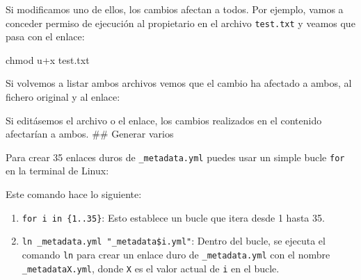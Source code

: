 \documentclass[
  jou,
  floatsintext,
  longtable,
  a4paper,
  nolmodern,
  notxfonts,
  notimes,
  colorlinks=true,linkcolor=blue,citecolor=blue,urlcolor=blue]{apa7}
\newenvironment{Shaded}{\begin{snugshade}}{\end{snugshade}}
\newcommand{\AttributeTok}[1]{\textcolor[rgb]{0.40,0.45,0.13}{#1}}
\newcommand{\ControlFlowTok}[1]{\textcolor[rgb]{0.00,0.23,0.31}{\textbf{#1}}}
\newcommand{\DataTypeTok}[1]{\textcolor[rgb]{0.68,0.00,0.00}{#1}}
\newcommand{\DecValTok}[1]{\textcolor[rgb]{0.68,0.00,0.00}{#1}}
\newcommand{\ExtensionTok}[1]{\textcolor[rgb]{0.00,0.23,0.31}{#1}}
\newcommand{\FunctionTok}[1]{\textcolor[rgb]{0.28,0.35,0.67}{#1}}
\newcommand{\KeywordTok}[1]{\textcolor[rgb]{0.00,0.23,0.31}{\textbf{#1}}}
\newcommand{\NormalTok}[1]{\textcolor[rgb]{0.00,0.23,0.31}{#1}}
\newcommand{\StringTok}[1]{\textcolor[rgb]{0.13,0.47,0.30}{#1}}
\newcommand{\VariableTok}[1]{\textcolor[rgb]{0.07,0.07,0.07}{#1}}
\providecommand{\tightlist}{%
  \setlength{\itemsep}{0pt}\setlength{\parskip}{0pt}}
\begin{document}
Si modificamos uno de ellos, los cambios afectan a todos. Por ejemplo,
vamos a conceder permiso de ejecución al propietario en el archivo
\texttt{test.txt} y veamos que pasa con el enlace:

\begin{Shaded}
\begin{Highlighting}[]
\FunctionTok{chmod}\NormalTok{ u+x test.txt}
\end{Highlighting}
\end{Shaded}

Si volvemos a listar ambos archivos vemos que el cambio ha afectado a
ambos, al fichero original y al enlace:

\begin{Shaded}
\end{Shaded}

Si editásemos el archivo o el enlace, los cambios realizados en el
contenido afectarían a ambos. \#\# Generar varios

Para crear 35 enlaces duros de \texttt{\_metadata.yml} puedes usar un
simple bucle \texttt{for} en la terminal de Linux:

\begin{Shaded}
\end{Shaded}

Este comando hace lo siguiente:

\begin{enumerate}
\def\labelenumi{\arabic{enumi}.}
\tightlist
\item
  \texttt{for\ i\ in\ \{1..35\}}: Esto establece un bucle que itera
  desde 1 hasta 35.
\item
  \texttt{ln\ \_metadata.yml\ "\_metadata\$i.yml"}: Dentro del bucle, se
  ejecuta el comando \texttt{ln} para crear un enlace duro de
  \texttt{\_metadata.yml} con el nombre \texttt{\_metadataX.yml}, donde
  \texttt{X} es el valor actual de \texttt{i} en el bucle.
\end{enumerate}
\end{document}
